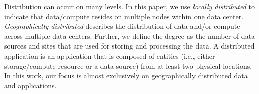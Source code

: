 

Distribution can occur on many levels.
In this paper, we use {\em locally distributed} to indicate that
data/compute resides on multiple nodes within one data center.
{\em Geographically distributed} describes the distribution of data and/or compute
across multiple data centers. Further, we define the degree as the
number of data sources and sites that are used for storing and
processing the data. A distributed application is an application that
is composed of entities (i.e., either storage/compute resource or a
data source) from at least two physical locations. In this work, our
focus is almost exclusively on geographically distributed data and
applications.











